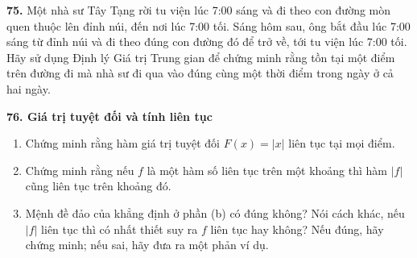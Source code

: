 \begin{minipage}[t]{0.485\textwidth}
\vspace{0.6em}
\textbf{75.} Một nhà sư Tây Tạng rời tu viện lúc 7:00 sáng và đi theo con đường mòn quen thuộc lên đỉnh núi, đến nơi lúc 7:00 tối. Sáng hôm sau, ông bắt đầu lúc 7:00 sáng từ đỉnh núi và đi theo đúng con đường đó để trở về, tới tu viện lúc 7:00 tối. Hãy sử dụng Định lý Giá trị Trung gian để chứng minh rằng tồn tại một điểm trên đường đi mà nhà sư đi qua vào đúng cùng một thời điểm trong ngày ở cả hai ngày.

\vspace{0.6em}
\textbf{76. Giá trị tuyệt đối và tính liên tục}
\begin{enumerate}[label=\textnormal{(\alph*)}, itemsep=2pt, topsep=2pt, leftmargin=1.8em]
    \item Chứng minh rằng hàm giá trị tuyệt đối $F(x) = |x|$ liên tục tại mọi điểm.
    \item Chứng minh rằng nếu $f$ là một hàm số liên tục trên một khoảng thì hàm $|f|$ cũng liên tục trên khoảng đó.
    \item Mệnh đề đảo của khẳng định ở phần (b) có đúng không? Nói cách khác, nếu $|f|$ liên tục thì có nhất thiết suy ra $f$ liên tục hay không? Nếu đúng, hãy chứng minh; nếu sai, hãy đưa ra một phản ví dụ.
\end{enumerate}
\end{minipage}
